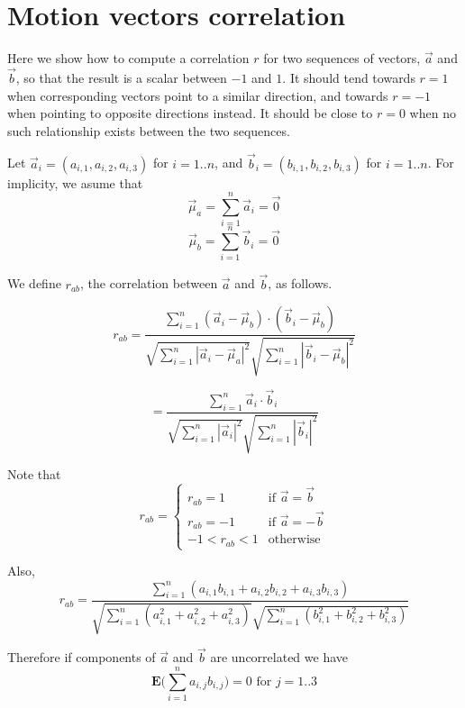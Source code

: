 \documentclass[12pt]{article}
\begin{document}
\title{}
\author{}
\date{}
\maketitle

\section{Motion vectors correlation}

Here we show how to compute a correlation $r$ for two sequences of vectors, $\vec{a}$ and $\vec{b}$, so that the result is a scalar between $-1$ and $1$. It should tend towards $r=1$ when corresponding vectors point to a similar direction, and towards $r=-1$ when pointing to opposite directions instead. It should be close to $r=0$ when no such relationship exists between the two sequences.

Let $\vec{a}_i = (a_{i,1}, a_{i,2}, a_{i,3})$ for $i=1..n$, and $\vec{b}_i = (b_{i,1}, b_{i,2}, b_{i,3})$ for $i=1..n$. For implicity, we asume that
	\[ \vec{\mu}_a = \sum_{i=1}^n \vec{a}_i = \vec{0} \]
	\[ \vec{\mu}_b = \sum_{i=1}^n \vec{b}_i = \vec{0} \]

We define $r_{ab}$, the correlation between $\vec{a}$ and $\vec{b}$, as follows.

\[ r_{ab} = \frac
	{ \sum_{i=1}^n (\vec{a}_i - \vec{\mu}_b) \cdot (\vec{b}_i - \vec{\mu}_b) }
	{ 	\sqrt{\sum_{i=1}^n |\vec{a}_i -  \vec{\mu}_a|^2}
		\sqrt{\sum_{i=1}^n |\vec{b}_i -  \vec{\mu}_b|^2}} \]
		
\[ = \frac
	{ \sum_{i=1}^n \vec{a}_i \cdot \vec{b}_i }
	{ 	\sqrt{\sum_{i=1}^n |\vec{a}_i|^2}
		\sqrt{\sum_{i=1}^n |\vec{b}_i|^2}} \]
		
Note that
\[ r_{ab} = \left\{
	\begin{array}{ll}
		r_{ab} = 1 & \mbox{if } \vec{a} = \vec{b} \\
		r_{ab} = -1 & \mbox{if } \vec{a} = -\vec{b} \\
		-1 < r_{ab} < 1 & \mbox{otherwise}  
	\end{array}
\right. \]
	
Also,
\[ r_{ab} = \frac
	{ \sum_{i=1}^n (a_{i,1} b_{i,1} + a_{i,2} b_{i,2} + a_{i,3} b_{i,3}) }
	{ 	\sqrt{\sum_{i=1}^n (a_{i,1}^2 + a_{i,2}^2 + a_{i,3}^2) }
		\sqrt{\sum_{i=1}^n (b_{i,1}^2 + b_{i,2}^2 + b_{i,3}^2)} } \]
		

Therefore if components of $\vec{a}$ and $\vec{b}$ are uncorrelated we have
\[ \mathbf{E}\bigg(\sum_{i=1}^n  a_{i,j}b_{i,j} \bigg) = 0 \mbox{ for } j=1..3 \]
\end{document}
